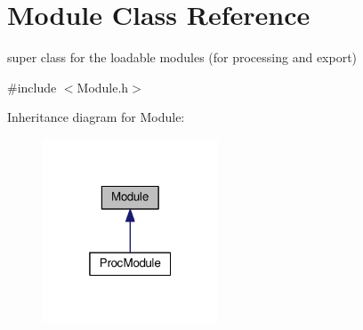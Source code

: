 \hypertarget{classModule}{}\section{Module Class Reference}
\label{classModule}


super class for the loadable modules (for processing and export)  




{\ttfamily \#include $<$Module.\+h$>$}



Inheritance diagram for Module\+:
\nopagebreak
\begin{figure}[H]
\begin{center}
\leavevmode
\includegraphics[width=148pt]{classModule__inherit__graph}
\end{center}
\end{figure}
